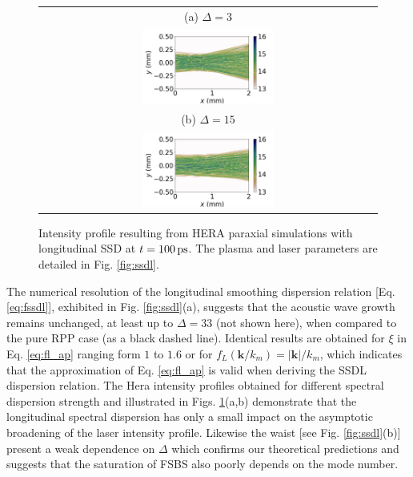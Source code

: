 \documentclass[
 reprint,
 amsmath,amssymb,
 aps,
]{revtex4-1}
\begin{document}
\begin{figure}
\begin{tabular}{c}
(a)  $\Delta=3$\\
\includegraphics[width=0.4\textwidth,trim={2cm 0 0 0},clip]{ISSDL1_t100ps.png}\\
(b) $\Delta=15$\\
\includegraphics[width=0.4\textwidth,trim={2cm 0 0 0},clip]{ISSDL5_t100ps.png}
\end{tabular}
\caption{ \label{fig:ssdl_I} 
  Intensity profile resulting from HERA  paraxial simulations  with longitudinal SSD at $t=100\,\rm ps$. The plasma and laser parameters are detailed in Fig. \ref{fig:ssdl}.
}
\end{figure}
The numerical resolution of the  longitudinal smoothing dispersion relation [Eq. \eqref{eq:fssdl}], exhibited in Fig. \ref{fig:ssdl}(a), suggests that the acoustic wave  growth remains unchanged, at least up to  $\Delta=33$ (not shown here),  when compared to the pure RPP case (as a black dashed line). Identical results are obtained for $\xi$ in Eq. \eqref{eq:fl_ap} ranging form $1$ to $1.6$ or for  $f_L(\mathbf{k}/k_m) = \vert \mathbf{k}\vert /k_m$, which indicates that the approximation of Eq.  \eqref{eq:fl_ap} is valid  when deriving the SSDL dispersion relation.
The Hera intensity profiles obtained for different spectral dispersion strength and illustrated in Figs. \ref{fig:ssdl_I}(a,b) demonstrate that the longitudinal spectral dispersion has only a small impact on the asymptotic broadening of the laser intensity profile.
Likewise the waist   [see Fig. \ref{fig:ssdl}(b)] present a weak  dependence  on $\Delta$ which confirms our theoretical predictions and suggests that the saturation of FSBS also poorly depends on the mode number.
\end{document}
